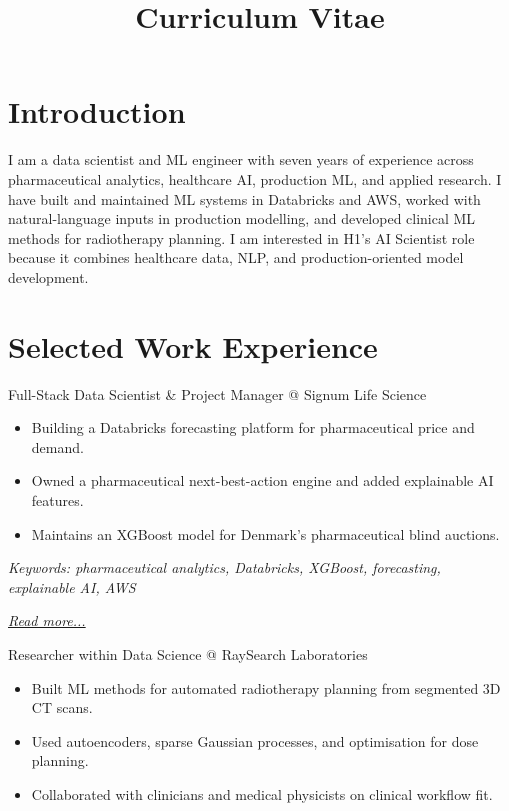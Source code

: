 \documentclass[11pt,a4paper]{moderncv}
\title{Curriculum Vitae}
\begin{document}
\makecvtitle

\section*{Introduction}
I am a data scientist and ML engineer with seven years of experience across pharmaceutical analytics, healthcare AI, production ML, and applied research. I have built and maintained ML systems in Databricks and AWS, worked with natural-language inputs in production modelling, and developed clinical ML methods for radiotherapy planning. I am interested in H1's AI Scientist role because it combines healthcare data, NLP, and production-oriented model development.

\section{Selected Work Experience}

\large{Full-Stack Data Scientist \& Project Manager @ Signum Life Science}
\normalsize
\begin{itemize}
    \item Building a Databricks forecasting platform for pharmaceutical price and demand.
    \item Owned a pharmaceutical next-best-action engine and added explainable AI features.
    \item Maintains an XGBoost model for Denmark's pharmaceutical blind auctions.
\end{itemize}

{\footnotesize\textit{Keywords: pharmaceutical analytics, Databricks, XGBoost, forecasting, explainable AI, AWS}}

\hfill{\small{\textit{\hyperref[sec:signum]{Read more...}}}}

\large{Researcher within Data Science @ RaySearch Laboratories}
\normalsize
\begin{itemize}
    \item Built ML methods for automated radiotherapy planning from segmented 3D CT scans.
    \item Used autoencoders, sparse Gaussian processes, and optimisation for dose planning.
    \item Collaborated with clinicians and medical physicists on clinical workflow fit.
\end{itemize}
\end{document}
